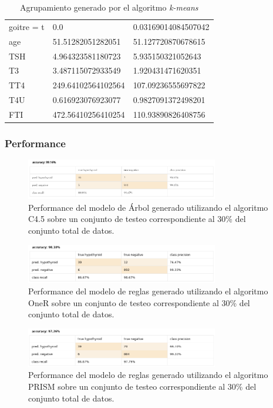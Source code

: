 \documentclass[osajnl,twocolumn,showpacs,superscriptaddress,10pt,floatfix]{revtex4-1} %
\begin{document}
\begin{table}[ht]
\begin{tabular}{|l|l|l|}
        goitre = t & 0.0 & 0.03169014084507042 \\
        age & 51.51282051282051 & 51.127720870678615 \\
        TSH & 4.964323581180723 & 5.935150321052643 \\
        T3 & 3.487115072933549 & 1.920431471620351 \\
        TT4 & 249.64102564102564 & 107.09236555697822 \\
        T4U & 0.616923076923077 & 0.9827091372498201 \\
        FTI & 472.56410256410254 & 110.93890826408756 \\
        \hline
    \end{tabular}
    \caption{Agrupamiento generado por el algoritmo \textit{k-means}}
    \label{table:k_means_model}
\end{table}

\subsubsection{Performance} \label{apendix:models:performance} 

\begin{figure}[h]
    \centering
    \includegraphics[width=0.75\textwidth]{models/w_j48_performance}
    \caption{Performance del modelo de Árbol generado utilizando el algoritmo C4.5 sobre un conjunto de testeo correspondiente al 30\% del conjunto total de datos.}
    \label{figure:w_j48_performance}
\end{figure}

\begin{figure}[h]
    \centering
    \includegraphics[width=0.75\textwidth]{models/w_oneR_performance}
    \caption{Performance del modelo de reglas generado utilizando el algoritmo OneR sobre un conjunto de testeo correspondiente al 30\% del conjunto total de datos.}
    \label{figure:w_oneR_performance}
\end{figure}

\begin{figure}[h]
    \centering
    \includegraphics[width=0.75\textwidth]{models/prism_performance}
    \caption{Performance del modelo de reglas generado utilizando el algoritmo PRISM sobre un conjunto de testeo correspondiente al 30\% del conjunto total de datos.}
    \label{figure:prism_performance}
\end{figure}
\end{document}
